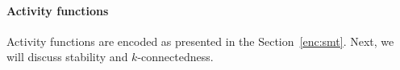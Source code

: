 
\paragraph{Activity functions}
%
Activity functions are encoded as presented in the Section~\ref{enc:smt}.
%
%
%
%
%
%
%
Next, we will discuss stability and $k$-connectedness.
%

